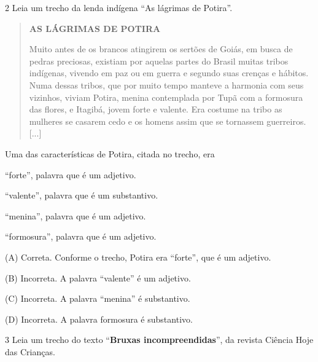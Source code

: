 \begin{escolha}
\begin{escolha}
{\begin{escolha}
\num{2} Leia um trecho da lenda indígena ``As lágrimas de Potira''.

\begin{quote}
\textbf{AS LÁGRIMAS DE POTIRA}

Muito antes de os brancos atingirem os sertões de Goiás, em busca de
pedras preciosas, existiam por aquelas partes do Brasil muitas tribos
indígenas, vivendo em paz ou em guerra e segundo suas crenças e hábitos.
Numa dessas tribos, que por muito tempo manteve a harmonia com seus
vizinhos, viviam Potira, menina contemplada por Tupã com a formosura das
flores, e Itagibá, jovem forte e valente. Era costume na tribo as
mulheres se casarem cedo e os homens assim que se tornassem guerreiros.
{[}...{]}
\end{quote}


Uma das características de Potira, citada no trecho, era

\begin{escolha}
\item ``forte'', palavra que é um adjetivo.

\item ``valente'', palavra que é um substantivo.

\item ``menina'', palavra que é um adjetivo.

\item ``formosura'', palavra que é um adjetivo.
\end{escolha}


(A) Correta. Conforme o trecho, Potira era ``forte'', que é um adjetivo.

(B) Incorreta. A palavra ``valente'' é um adjetivo.

(C) Incorreta. A palavra ``menina'' é substantivo.

(D) Incorreta. A palavra formosura é substantivo.

\num{3} Leia um trecho do texto ``\textbf{Bruxas incompreendidas}'',
da revista Ciência Hoje das Crianças.


\end{escolha}}
\end{escolha}
\end{escolha}
